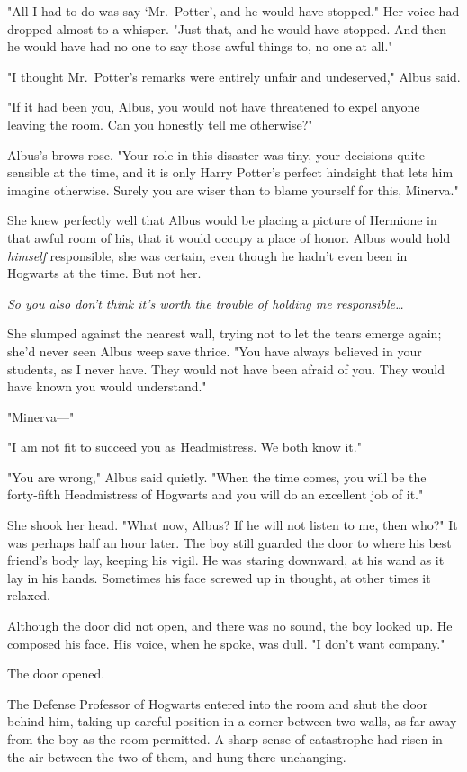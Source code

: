 "All I had to do was say `Mr.~Potter', and he would have stopped." Her voice
had dropped almost to a whisper. "Just that, and he would have stopped. And
then he would have had no one to say those awful things to, no one at all."

"I thought Mr.~Potter's remarks were entirely unfair and undeserved," Albus
said.

"If it had been you, Albus, you would not have threatened to expel anyone
leaving the room. Can you honestly tell me otherwise?"

Albus's brows rose. "Your role in this disaster was tiny, your decisions quite
sensible at the time, and it is only Harry Potter's perfect hindsight that lets
him imagine otherwise. Surely you are wiser than to blame yourself for this,
Minerva."

She knew perfectly well that Albus would be placing a picture of Hermione in
that awful room of his, that it would occupy a place of honor. Albus would hold
\emph{himself} responsible, she was certain, even though he hadn't even been in
Hogwarts at the time. But not her.

\emph{So you also don't think it's worth the trouble of holding me
responsible{\ldots}}

She slumped against the nearest wall, trying not to let the tears emerge again;
she'd never seen Albus weep save thrice. "You have always believed in your
students, as I never have. They would not have been afraid of you. They would
have known you would understand."

"Minerva---"

"I am not fit to succeed you as Headmistress. We both know it."

"You are wrong," Albus said quietly. "When the time comes, you will be the
forty-fifth Headmistress of Hogwarts and you will do an excellent job of it."

She shook her head. "What now, Albus? If he will not listen to me, then who?"
\later
It was perhaps half an hour later. The boy still guarded the door to where his
best friend's body lay, keeping his vigil. He was staring downward, at his wand
as it lay in his hands. Sometimes his face screwed up in thought, at other
times it relaxed.

Although the door did not open, and there was no sound, the boy looked up. He
composed his face. His voice, when he spoke, was dull. "I don't want company."

The door opened.

The Defense Professor of Hogwarts entered into the room and shut the door
behind him, taking up careful position in a corner between two walls, as far
away from the boy as the room permitted. A sharp sense of catastrophe had risen
in the air between the two of them, and hung there unchanging.

